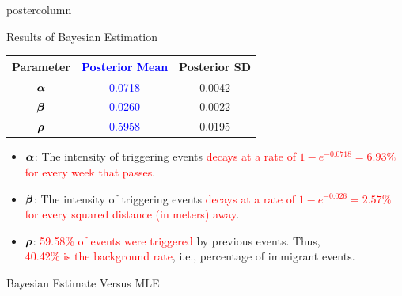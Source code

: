 \documentclass[final]{beamer}\usepackage[]{graphicx}\usepackage[]{color}
\newcommand{\balpha}{\mbox{\boldmath $\alpha$} }
\newcommand{\bbeta}{\mbox{\boldmath $\beta$} }
\newcommand{\brho}{\mbox{\boldmath $\rho$} }
\newcommand{\red}{\textcolor{red}}
\newcommand{\blue}{\textcolor{blue}}
\begin{document}
{\begin{frame}
\begin{columns}
\begin{column}{.33\textwidth}
\begin{beamercolorbox}[center,wd=\textwidth]{postercolumn}
\begin{minipage}[T]{.97\textwidth}
{\begin{block}{Results of Bayesian Estimation}
\vspace{-1.5cm}

 \renewcommand\arraystretch{1.3}
 \begin{center}
 \begin{tabular}{c|cc}
  \textbf{Parameter}  & \textbf{\blue{Posterior Mean}} & \textbf{Posterior SD} \\ \hline
  \large{$\balpha$}    & \blue{\large{0.0718}}  & \large{0.0042}  \\ %
  \large{$\bbeta$}     & \blue{\large{0.0260}}  & \large{0.0022}  \\ %
  \large{$\brho$}      & \blue{\large{0.5958}}  & \large{0.0195}  \\ %
 \end{tabular}  
 \end{center}
 
 \begin{itemize}
  \item $\balpha$: The intensity of triggering events \red{decays at a rate of $1-e^{-0.0718}=6.93\%$ for every week that passes}.
  \vspace{0.3cm}
  \item $\bbeta$:  The intensity of triggering events \red{decays at a rate of $1-e^{-0.026}=2.57\%$ for every squared distance (in meters) away}.
  \vspace{0.3cm}
  \item $\brho$: \red{59.58\% of events were triggered} by previous events. Thus,\\
  \red{40.42\%  is the background rate}, i.e., percentage of immigrant events.
 \end{itemize}
 
\end{block}
\vfill

\begin{block}{Bayesian Estimate Versus MLE}


\end{block}}
\end{minipage}
\end{beamercolorbox}
\end{column}
\end{columns}
\end{frame}}
\end{document}
